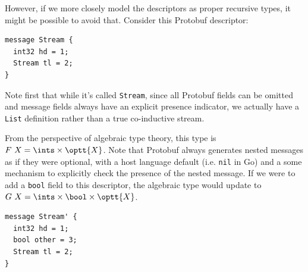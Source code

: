 However, if we more closely model the descriptors as proper recursive types, it
might be possible to avoid that. Consider this Protobuf descriptor:
\begin{verbatim}
message Stream {
  int32 hd = 1;
  Stream tl = 2;
}
\end{verbatim}
Note first that while it's called \texttt{Stream}, since all Protobuf fields can
be omitted and message fields always have an explicit presence indicator, we
actually have a \texttt{List} definition rather than a true co-inductive stream.

From the perspective of algebraic type theory, this type is
$F\ X = \ints \times \optt{X}$. Note that Protobuf always generates nested messages as
if they were optional, with a host language default (i.e. \texttt{nil} in Go)
and a some mechanism to explicitly check the presence of the nested message. If
we were to add a \texttt{bool} field to this descriptor, the algebraic type
would update to
$G\ X = \ints \times \bool \times \optt{X}$.

\begin{verbatim}
message Stream' {
  int32 hd = 1;
  bool other = 3;
  Stream tl = 2;
}
\end{verbatim}


